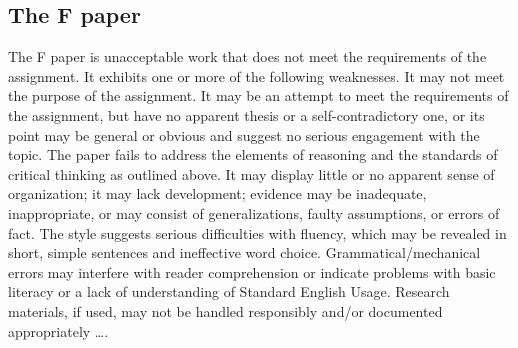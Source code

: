 \documentclass[12pt, hidelinks]{article} %
\begin{document}
\subsection{The F paper}

The F paper is unacceptable work that does not meet the requirements of the assignment. It exhibits one or more of the following weaknesses. It may not meet the purpose of the assignment. It may be an attempt to meet the requirements of the assignment, but have no apparent thesis or a self-contradictory one, or its point may be general or obvious and suggest no serious engagement with the topic. The paper fails to address the elements of reasoning and the standards of critical thinking as outlined above. It may display little or no apparent sense of organization; it may lack development; evidence may be inadequate, inappropriate, or may consist of generalizations, faulty assumptions, or errors of fact. The style suggests serious difficulties with fluency, which may be revealed in short, simple sentences and ineffective word choice. Grammatical/mechanical errors may interfere with reader comprehension or indicate problems with basic literacy or a lack of understanding of Standard English Usage. Research materials, if used, may not be handled responsibly and/or documented appropriately \dots.
\end{document}
